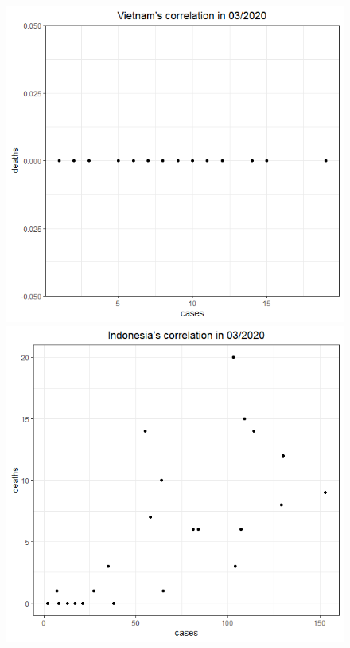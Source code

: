 \documentclass[english,10pt,table]{beamer}
\begin{document}
{\begin{figure}[H]
\begin{center}
        \includegraphics[scale = 0.2]{ix/ix.2/VN_03_2020.png}
        \includegraphics[scale = 0.2]{ix/ix.2/IDN_03_2020.png}

\end{center}
\end{figure}}
\end{document}
